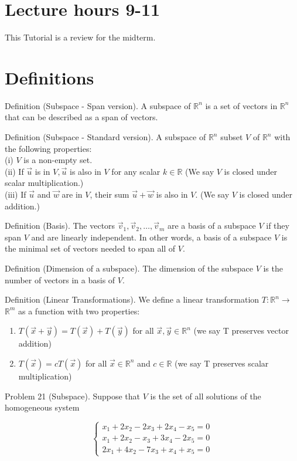 \documentclass[10pt]{article}
\begin{document}
\section*{Lecture hours 9-11}
This Tutorial is a review for the midterm.

\section*{Definitions}
Definition (Subspace - Span version). A subspace of $\mathbb{R}^{n}$ is a set of vectors in $\mathbb{R}^{n}$ that can be described as a span of vectors.

Definition (Subspace - Standard version). A subspace of $\mathbb{R}^{n}$ subset $V$ of $\mathbb{R}^{n}$ with the following properties:\\
(i) $V$ is a non-empty set.\\
(ii) If $\vec{u}$ is in $V, \vec{u}$ is also in $V$ for any scalar $k \in \mathbb{R}$ (We say $V$ is closed under scalar multiplication.)\\
(iii) If $\vec{u}$ and $\vec{w}$ are in $V$, their sum $\vec{u}+\vec{w}$ is also in $V$. (We say $V$ is closed under addition.)

Definition (Basis). The vectors $\vec{v}_{1}, \vec{v}_{2}, \ldots, \vec{v}_{m}$ are a basis of a subspace $V$ if they span $V$ and are linearly independent. In other words, a basis of a subspace $V$ is the minimal set of vectors needed to span all of $V$.

Definition (Dimension of a subspace). The dimension of the subspace $V$ is the number of vectors in a basis of $V$.

Definition (Linear Transformations). We define a linear transformation $T: \mathbb{R}^{n} \rightarrow$ $\mathbb{R}^{m}$ as a function with two properties:

\begin{enumerate}
  \item $T(\vec{x}+\vec{y})=T(\vec{x})+T(\vec{y})$ for all $\vec{x}, \vec{y} \in \mathbb{R}^{n}$ (we say T preserves vector addition)
  \item $T(\vec{x})=c T(\vec{x})$ for all $\vec{x} \in \mathbb{R}^{n}$ and $c \in \mathbb{R}$ (we say T preserves scalar multiplication)
\end{enumerate}

Problem 21 (Subspace). Suppose that $V$ is the set of all solutions of the homogeneous system

\[
\left\{\begin{array}{l}
x_{1}+2 x_{2}-2 x_{3}+2 x_{4}-x_{5}=0  \tag{5.1}\\
x_{1}+2 x_{2}-x_{3}+3 x_{4}-2 x_{5}=0 \\
2 x_{1}+4 x_{2}-7 x_{3}+x_{4}+x_{5}=0
\end{array}\right.
\]
\end{document}
